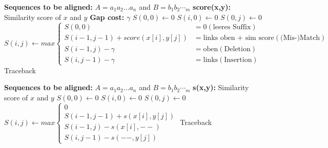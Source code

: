 \begin{algorithm}
    \caption{Smith-Waterman Darstellung nach Skript}
    \begin{algorithmic}
        \Statex \textbf{Sequences to be aligned:} $A=a_{1}a_{2}\dots a_{n}$ and $B=b_{1}b_{2}\dotsb_{m}$
        \Statex \textbf{score(x,y):} Similarity score of $x$ and $y$
        \Statex \textbf{Gap cost:} $\gamma$
        \State $S(0,0) \gets 0$
            \State $S(i,0) \gets 0$
        \EndFor
            \State $S(0,j) \gets 0$
        \EndFor
                \State $S(i,j) \gets max \begin{cases}
                                             S(0, 0) & = 0  (\text{leeres Suffix}) \\
                                             S(i - 1, j - 1) + score(x[i], y[j]) & = \text{links oben + sim score} ( \text{(Mis-)Match} ) \\
                                             S(i - 1, j) - \gamma & = \text{oben} ( \text{Deletion}) \\
                                             S(i, j - 1) - \gamma & = \text{links} ( \text{Insertion})
                \end{cases}$
            \EndFor
        \EndFor
        \State Traceback
    \end{algorithmic}\label{alg:smith_waterman}
\end{algorithm}


\begin{algorithm}
    \caption{Smith-Waterman Darstellung angepasst}
    \begin{algorithmic}
        \Statex \textbf{Sequences to be aligned:} $A=a_{1}a_{2}\dots a_{n}$ and $B=b_{1}b_{2}\dotsb_{m}$
        \Statex \textbf{s(x,y):} Similarity score of $x$ and $y$
        \State $S(0,0) \gets 0$
            \State $S(i,0) \gets 0$
        \EndFor
            \State $S(0,j) \gets 0$
        \EndFor
                \State $S(i,j) \gets max \begin{cases}
                                             0   \\
                                             S(i - 1, j - 1) + s(x[i], y[j])  \\
                                             S(i - 1, j) - s(x[i], --)  \\
                                             S(i, j - 1) - s(--, y[j])
                \end{cases}$
            \EndFor
        \EndFor
        \State Traceback
    \end{algorithmic}\label{alg:smith_waterman_angepasst}
\end{algorithm}

